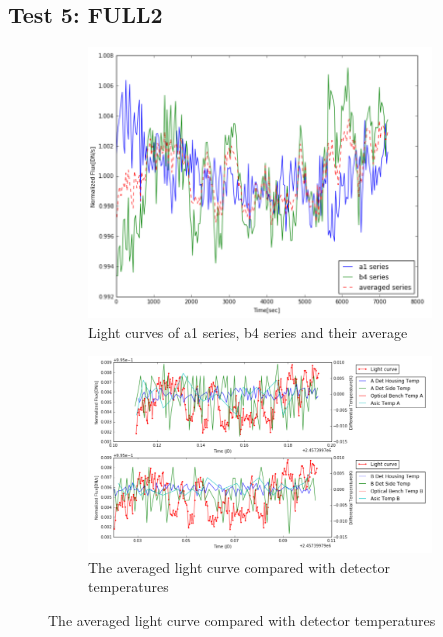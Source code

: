 \documentclass[conference]{IEEEtran}
\begin{document}
\subsection{Test 5: FULL2} 
\begin{figure}[H]
    \centering
    \begin{subfigure}{1}
        \includegraphics[scale=0.4]{ts_test5}
        \caption{Light curves of a1 series, b4 series and their average}
    \end{subfigure}

    \begin{subfigure}{2}
        \includegraphics[scale=0.4]{temp_test5}
        \caption{The averaged light curve compared with detector temperatures}
    \end{subfigure}
   

\end{figure}
\end{document}
